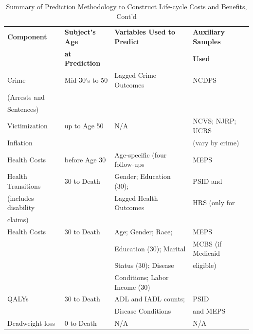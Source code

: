 \documentclass[static]{JJH-Beamer}
\begin{document}
\begin{frame}
\end{frame}

\begin{frame}
 \addtocounter{framenumber}{-1}

\begin{table}[H]
\addtocounter{table}{-1}
\caption{Summary of Prediction Methodology to Construct Life-cycle Costs and Benefits, Cont'd}\label{table:sources}
\begin{center}
\begin{tabular}{llll}
\toprule
\textbf{Component} & \textbf{Subject's Age} & \textbf{Variables Used to Predict} & \textbf{Auxiliary Samples} \\
&   \textbf{at Prediction} &    & \textbf{Used}\\
\midrule
Crime        & Mid-30's to 50  & Lagged Crime Outcomes & NCDPS \\
(Arrests and &     &  & \\
 Sentences)  &     & & \\
\midrule
Victimization  & up to Age 50  & N/A & NCVS; NJRP; UCRS \\
Inflation      &   &     & (vary by crime) \\
\midrule
Health Costs  & before Age 30 & Age-specific (four follow-ups  & MEPS \\
\midrule
Health Transitions   & 30 to Death & Gender; Education (30);  & PSID and   \\
(includes disability   &    & Lagged Health Outcomes  & HRS (only for \\
claims)    &    & \\
\midrule
Health Costs  & 30 to Death  & Age; Gender; Race;  & MEPS \\
              &  & Education (30); Marital  & MCBS (if Medicaid \\
              &  & Status (30); Disease & eligible) \\
              &  & Conditions; Labor Income (30) \\
\midrule
QALYs    & 30 to Death & ADL and IADL counts; & PSID  \\
         &   & Disease Conditions & and MEPS \\
\midrule
Deadweight-loss   & 0 to Death  & N/A & N/A  \\
\bottomrule
\end{tabular}
\end{center}
\end{table}

\end{frame}
\end{document}
